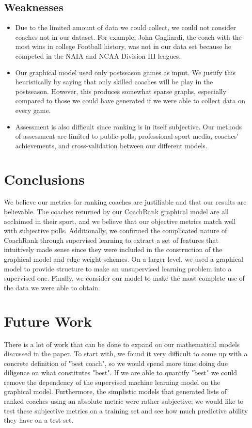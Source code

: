 \documentclass[11pt,notitlepage]{article}
\begin{document}
\subsection{Weaknesses}
\begin{itemize}
\item Due to the limited amount of data we could collect, we could not consider coaches not in our dataset. For example, John Gagliardi, the coach with the most wins in college Football history, was not in our data set because he competed in the NAIA and NCAA Division III leagues.

\item Our graphical model used only postseason games as input. We justify this heuristically by saying that only skilled coaches will be play in the postseason. However, this produces somewhat sparse graphs, especially compared to those we could have generated if we were able to collect data on every game.

\item Assessment is also difficult since ranking is in itself subjective. Our methods of assessment are limited to public polls, professional sport media, coaches' achievements, and cross-validation between our different models.

\end{itemize}

\section{Conclusions}
\noindent We believe our metrics for ranking coaches are justifiable and that our results are believable. The coaches returned by our CoachRank graphical model are all acclaimed in their sport, and we believe that our objective metrics match well with subjective polls. Additionally, we confirmed the complicated nature of CoachRank through supervised learning to extract a set of features that intuitively made sense since they were included in the construction of the graphical model and edge weight schemes. On a larger level, we used a graphical model to provide structure to make an unsupervised learning problem into a supervised one. Finally, we consider our model to make the most complete use of the data we were able to obtain.  

\section{Future Work}

\noindent There is a lot of work that can be done to expand on our mathematical models discussed in the paper. To start with, we found it very difficult to come up with a concrete definition of "best coach", so we would spend more time doing due diligence on what constitutes "best". If we are able to quantify "best" we could remove the dependency of the supervised machine learning model on the graphical model. Furthermore, the simplistic models that generated lists of ranked coaches using an absolute metric were rather subjective; we would like to test these subjective metrics on a training set and see how much predictive ability they have on a test set. 
\end{document}
